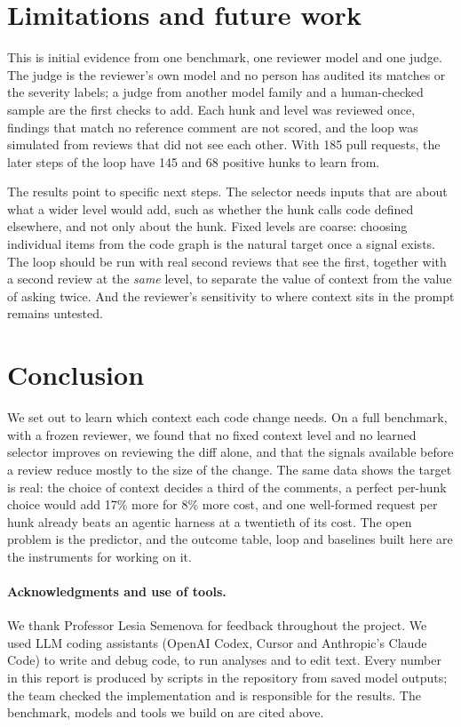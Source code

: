\documentclass{article}
\begin{document}
\section{Limitations and future work}
This is initial evidence from one benchmark, one reviewer model and one judge. The judge is the reviewer's own model and no person has audited its matches or the severity labels; a judge from another model family and a human-checked sample are the first checks to add. Each hunk and level was reviewed once, findings that match no reference comment are not scored, and the loop was simulated from reviews that did not see each other. With 185 pull requests, the later steps of the loop have 145 and 68 positive hunks to learn from.

The results point to specific next steps. The selector needs inputs that are about what a wider level would add, such as whether the hunk calls code defined elsewhere, and not only about the hunk. Fixed levels are coarse: choosing individual items from the code graph is the natural target once a signal exists. The loop should be run with real second reviews that see the first, together with a second review at the \emph{same} level, to separate the value of context from the value of asking twice. And the reviewer's sensitivity to where context sits in the prompt remains untested.

\section{Conclusion}
We set out to learn which context each code change needs. On a full benchmark, with a frozen reviewer, we found that no fixed context level and no learned selector improves on reviewing the diff alone, and that the signals available before a review reduce mostly to the size of the change. The same data shows the target is real: the choice of context decides a third of the comments, a perfect per-hunk choice would add 17\% more for 8\% more cost, and one well-formed request per hunk already beats an agentic harness at a twentieth of its cost. The open problem is the predictor, and the outcome table, loop and baselines built here are the instruments for working on it.

\paragraph{Acknowledgments and use of tools.} We thank Professor Lesia Semenova for feedback throughout the project. We used LLM coding assistants (OpenAI Codex, Cursor and Anthropic's Claude Code) to write and debug code, to run analyses and to edit text. Every number in this report is produced by scripts in the repository from saved model outputs; the team checked the implementation and is responsible for the results. The benchmark, models and tools we build on are cited above.
\end{document}
